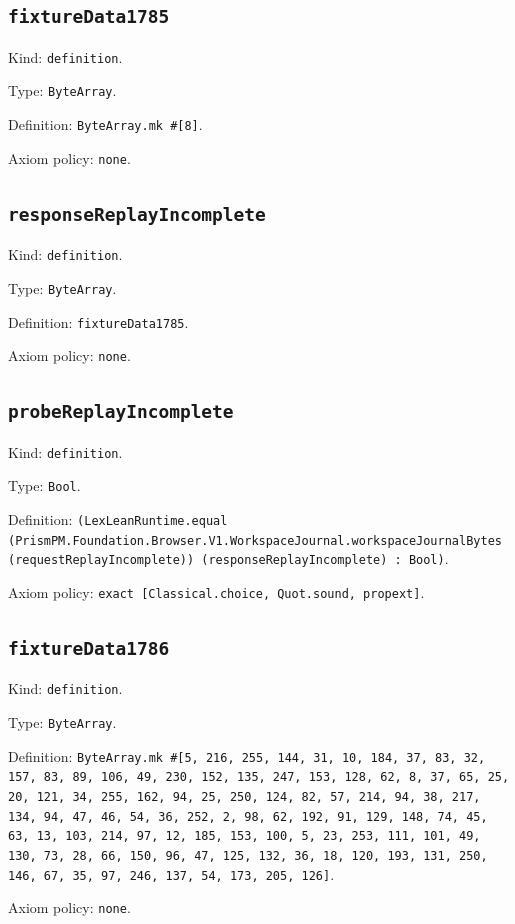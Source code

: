 \documentclass[11pt]{article}
\begin{document}
\subsection*{\texttt{fixtureData1785}}
\noindent Kind: \texttt{definition}.\par
\noindent Type: \texttt{ByteArray}.\par
\noindent Definition: \texttt{ByteArray.mk \#[8]}.\par
\noindent Axiom policy: \texttt{none}.\par
\subsection*{\texttt{responseReplayIncomplete}}
\noindent Kind: \texttt{definition}.\par
\noindent Type: \texttt{ByteArray}.\par
\noindent Definition: \texttt{fixtureData1785}.\par
\noindent Axiom policy: \texttt{none}.\par
\subsection*{\texttt{probeReplayIncomplete}}
\noindent Kind: \texttt{definition}.\par
\noindent Type: \texttt{Bool}.\par
\noindent Definition: \texttt{(LexLeanRuntime.equal (PrismPM.Foundation.Browser.V1.WorkspaceJournal.workspaceJournalBytes (requestReplayIncomplete)) (responseReplayIncomplete) : Bool)}.\par
\noindent Axiom policy: \texttt{exact [Classical.choice, Quot.sound, propext]}.\par
\subsection*{\texttt{fixtureData1786}}
\noindent Kind: \texttt{definition}.\par
\noindent Type: \texttt{ByteArray}.\par
\noindent Definition: \texttt{ByteArray.mk \#[5, 216, 255, 144, 31, 10, 184, 37, 83, 32, 157, 83, 89, 106, 49, 230, 152, 135, 247, 153, 128, 62, 8, 37, 65, 25, 20, 121, 34, 255, 162, 94, 25, 250, 124, 82, 57, 214, 94, 38, 217, 134, 94, 47, 46, 54, 36, 252, 2, 98, 62, 192, 91, 129, 148, 74, 45, 63, 13, 103, 214, 97, 12, 185, 153, 100, 5, 23, 253, 111, 101, 49, 130, 73, 28, 66, 150, 96, 47, 125, 132, 36, 18, 120, 193, 131, 250, 146, 67, 35, 97, 246, 137, 54, 173, 205, 126]}.\par
\noindent Axiom policy: \texttt{none}.\par
\end{document}
